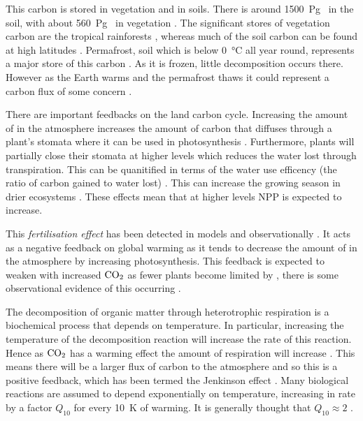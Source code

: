 This carbon is stored in vegetation and in soils. There is around \SI{1500}{\peta\gram\carbon} in the soil, with about \SI{560}{\peta\gram\carbon} in vegetation \parencite{Crowther2019}.
The significant stores of vegetation carbon are the tropical rainforests \parencite{Malhi2006}, whereas much of the soil carbon can be found at high latitudes \parencite{Varney2020}.
Permafrost, soil which is below \SI{0}{\degreeCelsius} all year round, represents a major store of this carbon \parencite{Hugelius2014}. As it is frozen, little decomposition occurs there.
However as the Earth warms and the permafrost thaws it could represent a carbon flux of some concern \parencite{Schuur2015}.


There are important feedbacks on the land carbon cycle.
Increasing the amount of  in the atmosphere increases the amount of carbon that diffuses through a plant's stomata where it can be used in photosynthesis \parencite{Farquhar1980}.
Furthermore, plants will partially close their stomata at higher  levels \parencite{DeKauwe2013} which reduces the water lost through transpiration. This can be quanitified in terms of the
water use efficency (the ratio of carbon gained to water lost) \parencite{Drake1997}. This can increase the growing season in drier ecosystems \parencite{Frank2015}.
These effects mean that at higher  levels NPP is expected to increase.

This \emph{ fertilisation effect} has been detected in models \parencite{Friedlingstein2006,Arora2020,Wenzel2016} and observationally \parencite{Ainsworth2007,KolbySmith2016}.
It acts as a negative feedback on global warming as it tends to decrease the amount of  in the atmosphere by increasing photosynthesis. This feedback is
expected to weaken with increased $\ce{CO2}$ as fewer plants become limited by , there is some observational evidence of this occurring \parencite{Wang2020}.

The decomposition of organic matter through heterotrophic respiration is a biochemical process that depends on temperature. In particular, increasing the temperature of the decomposition reaction
will increase the rate of this reaction. Hence as $\ce{CO2}$ has a warming effect the amount of respiration will increase \parencite{Jenkinson1991}. 
This means there will be a larger flux of carbon to the atmosphere and so this is a positive feedback, which has been termed the Jenkinson effect \parencite{Luke2011}.
Many biological reactions are assumed to depend exponentially on temperature, increasing in rate by a factor $Q_{10}$ for every \SI{10}{\kelvin} of warming.
It is generally thought that $Q_{10} \approx 2$ \parencite{Jones2001}.

